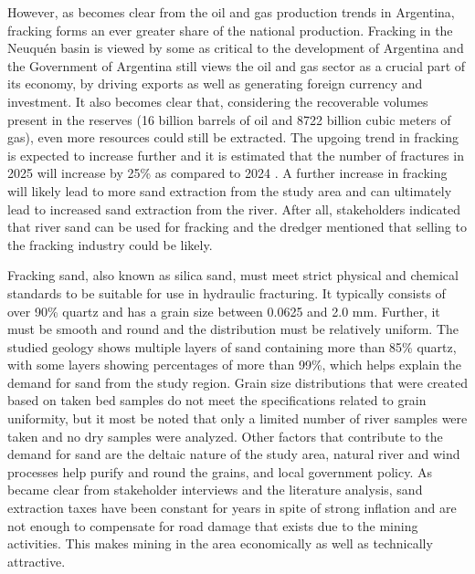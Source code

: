 However, as becomes clear from the oil and gas production trends in Argentina, fracking forms an ever greater share of the national production. Fracking in the Neuquén basin is viewed by some as critical to the development of Argentina and the Government of Argentina still views the oil and gas sector as a crucial part of its economy, by driving exports as well as generating foreign currency and investment. It also becomes clear that, considering the recoverable volumes present in the reserves (16 billion barrels of oil and 8722 billion cubic meters of gas), even more resources could still be extracted. The upgoing trend in fracking is expected to increase further and it is estimated that the number of fractures in 2025 will increase by 25\% as compared to 2024 \autocite{barnedaFrackingVacaMuerta2025}. A further increase in fracking will likely lead to more sand extraction from the study area and can ultimately lead to increased sand extraction from the river. After all, stakeholders indicated that river sand can be used for fracking and the dredger mentioned that selling to the fracking industry could be likely.

Fracking sand, also known as silica sand, must meet strict physical and chemical standards to be suitable for use in hydraulic fracturing. It typically consists of over 90\% quartz and has a grain size between 0.0625 and 2.0 mm. Further, it must be smooth and round and the distribution must be relatively uniform. The studied geology shows multiple layers of sand containing more than 85\% quartz, with some layers showing percentages of more than 99\%, which helps explain the demand for sand from the study region. Grain size distributions that were created based on taken bed samples do not meet the specifications related to grain uniformity, but it most be noted that only a limited number of river samples were taken and no dry samples were analyzed. Other factors that contribute to the demand for sand are the deltaic nature of the study area, natural river and wind processes help purify and round the grains, and local government policy. As became clear from stakeholder interviews and the literature analysis, sand extraction taxes have been constant for years in spite of strong inflation and are not enough to compensate for road damage that exists due to the mining activities. This makes mining in the area economically as well as technically attractive.

